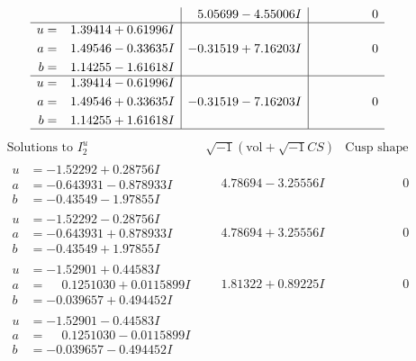 \documentclass[1p]{elsarticle_modified}
\theoremstyle{definition}
\newcommand{\I}{\sqrt{-1}}
\begin{document}
$$\begin{array}{c|c|c}
 & \phantom{-}5.05699 - 4.55006 I & \phantom{-0.000000 } 0 \\ \hline\begin{aligned}
u &= \phantom{-}1.39414 + 0.61996 I \\
a &= \phantom{-}1.49546 - 0.33635 I \\
b &= \phantom{-}1.14255 - 1.61618 I\end{aligned}
 & -0.31519 + 7.16203 I & \phantom{-0.000000 } 0 \\ \hline\begin{aligned}
u &= \phantom{-}1.39414 - 0.61996 I \\
a &= \phantom{-}1.49546 + 0.33635 I \\
b &= \phantom{-}1.14255 + 1.61618 I\end{aligned}
 & -0.31519 - 7.16203 I & \phantom{-0.000000 } 0\\
 \hline 
 \end{array}$$\newpage$$\begin{array}{c|c|c}  
\text{Solutions to }I^u_{2}& \I (\text{vol} + \sqrt{-1}CS) & \text{Cusp shape}\\
 \hline 
\begin{aligned}
u &= -1.52292 + 0.28756 I \\
a &= -0.643931 - 0.878933 I \\
b &= -0.43549 - 1.97855 I\end{aligned}
 & \phantom{-}4.78694 - 3.25556 I & \phantom{-0.000000 } 0 \\ \hline\begin{aligned}
u &= -1.52292 - 0.28756 I \\
a &= -0.643931 + 0.878933 I \\
b &= -0.43549 + 1.97855 I\end{aligned}
 & \phantom{-}4.78694 + 3.25556 I & \phantom{-0.000000 } 0 \\ \hline\begin{aligned}
u &= -1.52901 + 0.44583 I \\
a &= \phantom{-}0.1251030 + 0.0115899 I \\
b &= -0.039657 + 0.494452 I\end{aligned}
 & \phantom{-}1.81322 + 0.89225 I & \phantom{-0.000000 } 0 \\ \hline\begin{aligned}
u &= -1.52901 - 0.44583 I \\
a &= \phantom{-}0.1251030 - 0.0115899 I \\
b &= -0.039657 - 0.494452 I\end{aligned}

\end{array}$$
\end{document}
